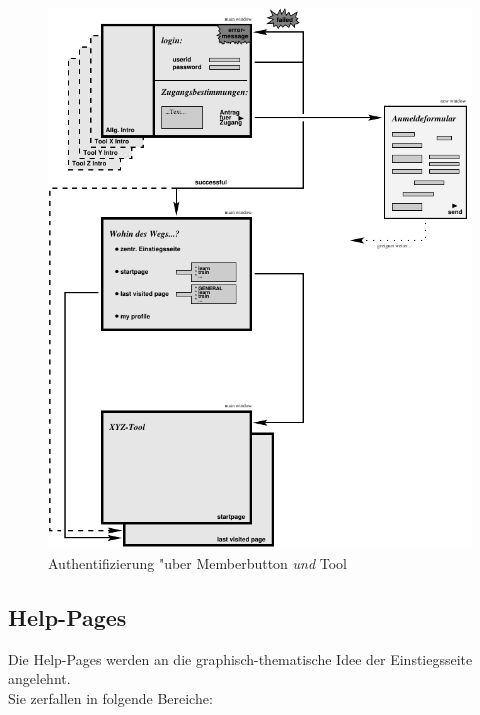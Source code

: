 \begin{figure}[h!]
\begin{center}
\ifx\pdfoutput\undefined
\else
  \includegraphics{Skizzen/authent_page_overview.pdf}
\fi
\caption{Authentifizierung "uber Memberbutton \textit{und} Tool}
\end{center}
\end{figure}
 

\clearpage


\subsection{Help-Pages}

Die Help-Pages werden an die graphisch-thematische Idee der Einstiegsseite 
angelehnt.\\
Sie zerfallen in folgende Bereiche:

